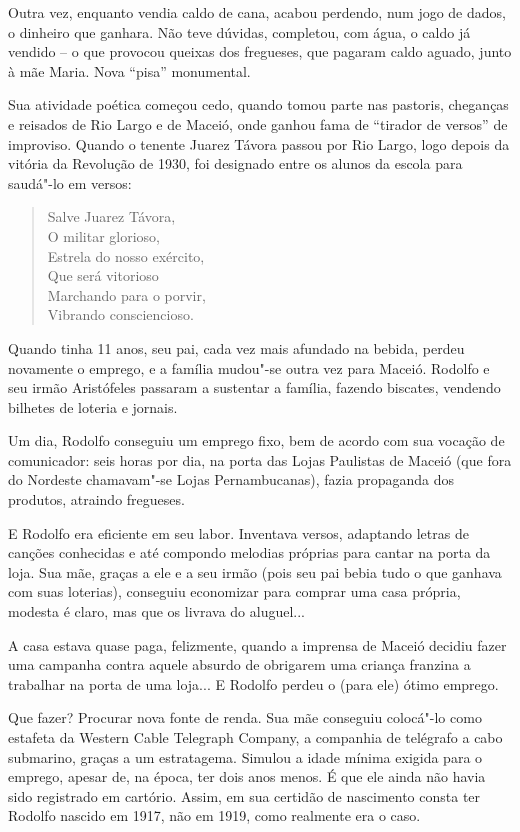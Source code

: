  Outra vez, enquanto vendia caldo de cana, acabou perdendo, num jogo de
dados, o dinheiro que ganhara. Não teve dúvidas, completou, com água, o
caldo já vendido -- o que provocou queixas dos fregueses, que
pagaram caldo aguado, junto à mãe Maria. Nova
``pisa'' monumental. 

 Sua atividade poética começou cedo, quando tomou parte nas pastoris,
cheganças e reisados de Rio Largo e de Maceió, onde ganhou fama de
``tirador de versos'' de improviso. Quando o
tenente Juarez Távora passou por Rio Largo, logo depois da vitória da
Revolução de 1930, foi designado entre os alunos da escola para
saudá"-lo em versos: 

\begin{verse}
Salve Juarez Távora, \\
O militar glorioso, \\
Estrela do nosso exército,\\ 
Que será vitorioso \\
Marchando para o porvir,\\ 
Vibrando consciencioso. 
\end{verse}

 Quando tinha 11 anos, seu pai, cada vez mais afundado na bebida, perdeu
novamente o emprego, e a família mudou"-se outra vez para Maceió.
Rodolfo e seu irmão Aristófeles passaram a sustentar a família, fazendo
biscates, vendendo bilhetes de loteria e jornais. 

 Um dia, Rodolfo conseguiu um emprego fixo, bem de acordo com sua
vocação de comunicador: seis horas por dia, na porta das Lojas
Paulistas de Maceió (que fora do Nordeste chamavam"-se Lojas
Pernambucanas), fazia propaganda dos produtos, atraindo fregueses. 

 E Rodolfo era eficiente em seu labor. Inventava versos, adaptando
letras de canções conhecidas e até compondo melodias próprias para
cantar na porta da loja. Sua mãe, graças a ele e a seu irmão (pois seu
pai bebia tudo o que ganhava com suas loterias), conseguiu economizar
para comprar uma casa própria, modesta é claro, mas que os livrava do
aluguel... 

 A casa estava quase paga, felizmente, quando a imprensa de Maceió
decidiu fazer uma campanha contra aquele absurdo de obrigarem uma
criança franzina a trabalhar na porta de uma loja... E Rodolfo perdeu o
(para ele) ótimo emprego. 

 Que fazer? Procurar nova fonte de renda. Sua mãe conseguiu colocá"-lo
como estafeta da Western Cable Telegraph Company, a companhia de
telégrafo a cabo submarino, graças a um estratagema. Simulou a idade
mínima exigida para o emprego, apesar de, na época, ter dois anos
menos. É que ele ainda não havia sido registrado em cartório. Assim, em
sua certidão de nascimento consta ter Rodolfo nascido em 1917, não em
1919, como realmente era o caso. 

